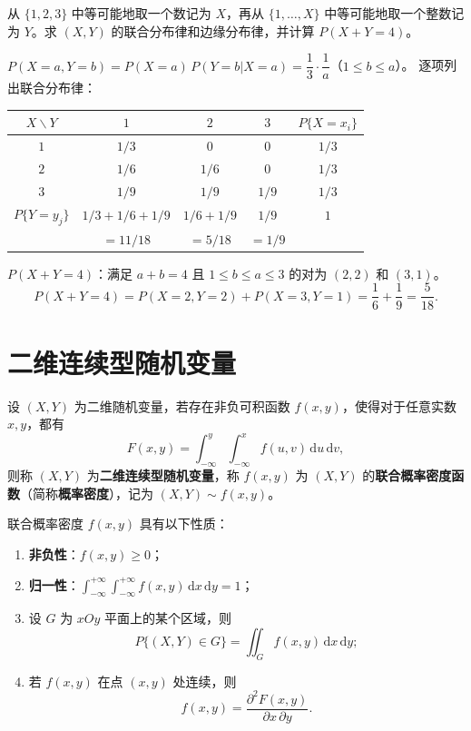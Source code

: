 \documentclass[lang=cn,11pt]{elegantbook}
\begin{document}
\begin{exercise}[离散条件均匀分布] \label{exer:3-d5}
从 $\{1,2,3\}$ 中等可能地取一个数记为 $X$，再从 $\{1,\dots,X\}$ 中等可能地取一个整数记为 $Y$。求 $(X,Y)$ 的联合分布律和边缘分布律，并计算 $P(X+Y=4)$。
\end{exercise}
\begin{solution}
$P(X=a,Y=b) = P(X=a)\,P(Y=b|X=a) = \dfrac{1}{3}\cdot\dfrac{1}{a}$（$1 \leqslant b \leqslant a$）。
逐项列出联合分布律：
\begin{center}
\begin{tabular}{c|ccc|c}
\toprule
$X \backslash Y$ & $1$ & $2$ & $3$ & $P\{X=x_i\}$ \\
\midrule
$1$ & $1/3$ & $0$ & $0$ & $1/3$ \\[4pt]
$2$ & $1/6$ & $1/6$ & $0$ & $1/3$ \\[4pt]
$3$ & $1/9$ & $1/9$ & $1/9$ & $1/3$ \\
\midrule
$P\{Y=y_j\}$ & $1/3+1/6+1/9$ & $1/6+1/9$ & $1/9$ & $1$ \\
& $= 11/18$ & $= 5/18$ & $= 1/9$ & \\
\bottomrule
\end{tabular}
\end{center}
$P(X+Y=4)$：满足 $a+b=4$ 且 $1\leqslant b\leqslant a\leqslant 3$ 的对为 $(2,2)$ 和 $(3,1)$。
\[
P(X+Y=4) = P(X=2,Y=2)+P(X=3,Y=1) = \frac{1}{6}+\frac{1}{9} = \frac{5}{18}.
\]
\end{solution}







\section{二维连续型随机变量}

\begin{definition}[二维连续型随机变量] \label{def:2d-continuous}
设 $(X,Y)$ 为二维随机变量，若存在非负可积函数 $f(x,y)$，使得对于任意实数 $x,y$，都有
\[
F(x,y) = \int_{-\infty}^{y}\int_{-\infty}^{x}f(u,v)\,\mathrm{d}u\,\mathrm{d}v,
\]
则称 $(X,Y)$ 为\textbf{二维连续型随机变量}，称 $f(x,y)$ 为 $(X,Y)$ 的\textbf{联合概率密度函数}（简称\textbf{概率密度}），记为 $(X,Y) \sim f(x,y)$。
\end{definition}

\begin{property}\label{prop:joint-pdf}
联合概率密度 $f(x,y)$ 具有以下性质：
\begin{enumerate}
    \item \textbf{非负性}：$f(x,y) \geqslant 0$；
    \item \textbf{归一性}：$\displaystyle\int_{-\infty}^{+\infty}\int_{-\infty}^{+\infty}f(x,y)\,\mathrm{d}x\,\mathrm{d}y = 1$；
    \item 设 $G$ 为 $xOy$ 平面上的某个区域，则
    \[
    P\{(X,Y) \in G\} = \iint_G f(x,y)\,\mathrm{d}x\,\mathrm{d}y;
    \]
    \item 若 $f(x,y)$ 在点 $(x,y)$ 处连续，则
    \[
    f(x,y) = \frac{\partial^2 F(x,y)}{\partial x\,\partial y}.
    \]
\end{enumerate}
\end{property}
\end{document}

